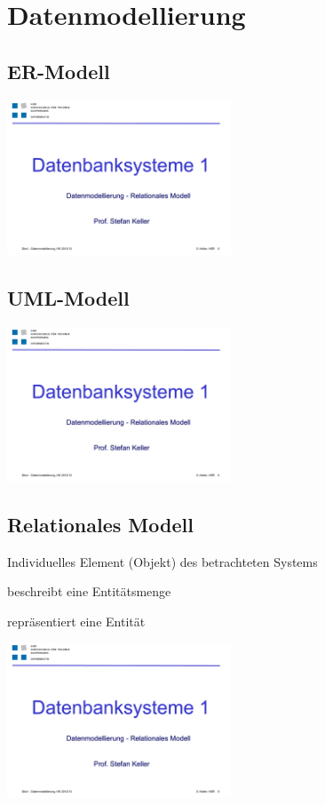 \section{Datenmodellierung}
    \begin{multicols}{2}
        \subsection{ER-Modell}
            \includegraphics[page=16,trim=20 120 20 140,clip=true,width=0.5\textwidth]{images/datenmodellierung.pdf}
        \subsection{UML-Modell}
            \includegraphics[page=29,trim=20 30 20 85,clip=true,width=0.5\textwidth]{images/datenmodellierung.pdf}
    \end{multicols}
    \begin{multicols}{2}        
        \subsection{Relationales Modell}
            \begin{description}
            \setlength{\itemsep}{0pt}    
                \item[Entitität] Individuelles Element (Objekt) des betrachteten Systems
                \item[Relation] beschreibt eine Entitätsmenge
                \item[Tupel] repräsentiert eine Entität
            \end{description}
            \includegraphics[page=42,trim=10 30 0 84,clip=true,width=0.5\textwidth]{images/datenmodellierung.pdf}
    \end{multicols}    
